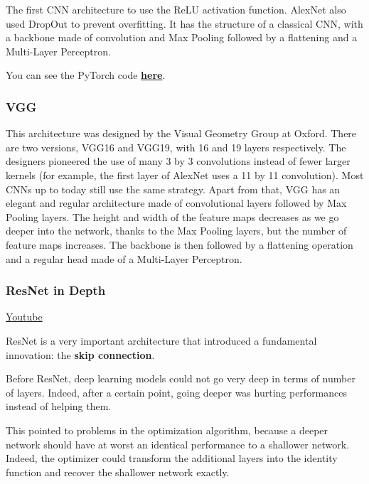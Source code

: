 The first CNN architecture to use the ReLU activation function. AlexNet also used DropOut to prevent overfitting. It has the structure of a classical CNN, with a backbone made of convolution and Max Pooling followed by a flattening and a Multi-Layer Perceptron. \newline

You can see the PyTorch code \href{https://github.com/pytorch/vision/blob/59c4de9123eb1d39bb700f7ae7780fb9c7217910/torchvision/models/alexnet.py\#L17}{\textbf{here}}.

\subsubsection{VGG}

This architecture was designed by the Visual Geometry Group at Oxford. There are two versions, VGG16 and VGG19, with 16 and 19 layers respectively. The designers pioneered the use of many 3 by 3 convolutions instead of fewer larger kernels (for example, the first layer of AlexNet uses a 11 by 11 convolution). Most CNNs up to today still use the same strategy. Apart from that, VGG has an elegant and regular architecture made of convolutional layers followed by Max Pooling layers. The height and width of the feature maps decreases as we go deeper into the network, thanks to the Max Pooling layers, but the number of feature maps increases. The backbone is then followed by a flattening operation and a regular head made of a Multi-Layer Perceptron.

\subsubsection{ResNet in Depth}
\href{https://www.youtube.com/watch?v=fPvp9WSXfK4&ab_channel=Udacity}{Youtube} \newline

ResNet is a very important architecture that introduced a fundamental innovation: the \textbf{skip connection}.\newline

Before ResNet, deep learning models could not go very deep in terms of number of layers. Indeed, after a certain point, going deeper was hurting performances instead of helping them.\newline

This pointed to problems in the optimization algorithm, because a deeper network should have at worst an identical performance to a shallower network. Indeed, the optimizer could transform the additional layers into the identity function and recover the shallower network exactly.\newline

